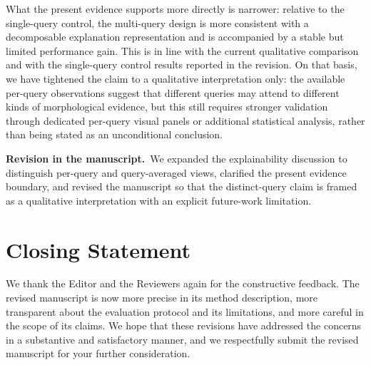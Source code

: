 \documentclass[11pt]{article}
\newcommand{\revisionheader}{\textbf{Revision in the manuscript.}}
\begin{document}
What the present evidence supports more directly is narrower: relative to the single-query control, the multi-query design is more consistent with a decomposable explanation representation and is accompanied by a stable but limited performance gain. This is in line with the current qualitative comparison and with the single-query control results reported in the revision. On that basis, we have tightened the claim to a qualitative interpretation only: the available per-query observations suggest that different queries may attend to different kinds of morphological evidence, but this still requires stronger validation through dedicated per-query visual panels or additional statistical analysis, rather than being stated as an unconditional conclusion.

\revisionheader\ We expanded the explainability discussion to distinguish per-query and query-averaged views, clarified the present evidence boundary, and revised the manuscript so that the distinct-query claim is framed as a qualitative interpretation with an explicit future-work limitation.

\section*{Closing Statement}

We thank the Editor and the Reviewers again for the constructive feedback. The revised manuscript is now more precise in its method description, more transparent about the evaluation protocol and its limitations, and more careful in the scope of its claims. We hope that these revisions have addressed the concerns in a substantive and satisfactory manner, and we respectfully submit the revised manuscript for your further consideration.
\end{document}

